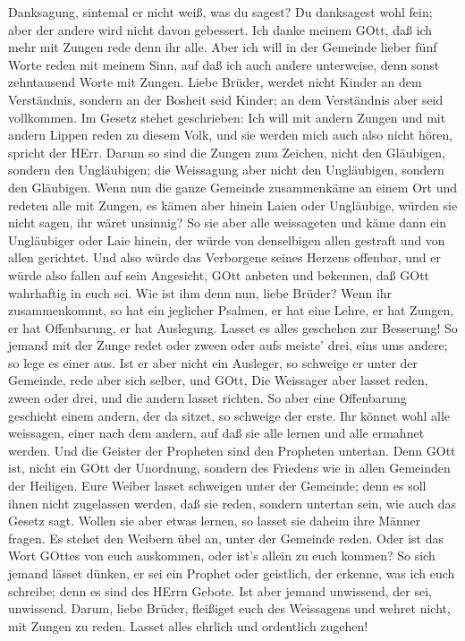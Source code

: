 Danksagung, sintemal er nicht weiß, was du sagest?  Du
danksagest wohl fein; aber der andere wird nicht davon gebessert.
 Ich danke meinem GOtt, daß ich mehr mit Zungen rede denn
ihr alle.  Aber ich will in der Gemeinde lieber fünf Worte
reden mit meinem Sinn, auf daß ich auch andere unterweise, denn sonst
zehntausend Worte mit Zungen.  Liebe Brüder, werdet nicht
Kinder an dem Verständnis, sondern an der Bosheit seid Kinder; an dem
Verständnis aber seid vollkommen.  Im Gesetz stehet
geschrieben: Ich will mit andern Zungen und mit andern Lippen reden zu
diesem Volk, und sie werden mich auch also nicht hören, spricht der
HErr.  Darum so sind die Zungen zum Zeichen, nicht den
Gläubigen, sondern den Ungläubigen; die Weissagung aber nicht den
Ungläubigen, sondern den Gläubigen.  Wenn nun die ganze
Gemeinde zusammenkäme an einem Ort und redeten alle mit Zungen, es kämen
aber hinein Laien oder Ungläubige, würden sie nicht sagen, ihr wäret
unsinnig?  So sie aber alle weissageten und käme dann ein
Ungläubiger oder Laie hinein, der würde von denselbigen allen gestraft
und von allen gerichtet.  Und also würde das Verborgene
seines Herzens offenbar, und er würde also fallen auf sein Angesicht,
GOtt anbeten und bekennen, daß GOtt wahrhaftig in euch sei.
 Wie ist ihm denn nun, liebe Brüder? Wenn ihr
zusammenkommt, so hat ein jeglicher Psalmen, er hat eine Lehre, er hat
Zungen, er hat Offenbarung, er hat Auslegung. Lasset es alles geschehen
zur Besserung!  So jemand mit der Zunge redet oder zween
oder aufs meiste' drei, eins ums andere; so lege es einer aus.
 Ist er aber nicht ein Ausleger, so schweige er unter der
Gemeinde, rede aber sich selber, und GOtt,  Die Weissager
aber lasset reden, zween oder drei, und die andern lasset richten.
 So aber eine Offenbarung geschieht einem andern, der da
sitzet, so schweige der erste.  Ihr könnet wohl alle
weissagen, einer nach dem andern, auf daß sie alle lernen und alle
ermahnet werden.  Und die Geister der Propheten sind den
Propheten untertan.  Denn GOtt ist, nicht ein GOtt der
Unordnung, sondern des Friedens wie in allen Gemeinden der Heiligen.
 Eure Weiber lasset schweigen unter der Gemeinde; denn es
soll ihnen nicht zugelassen werden, daß sie reden, sondern untertan
sein, wie auch das Gesetz sagt.  Wollen sie aber etwas
lernen, so lasset sie daheim ihre Männer fragen. Es stehet den Weibern
übel an, unter der Gemeinde reden.  Oder ist das Wort
GOttes von euch auskommen, oder ist's allein zu euch kommen?
 So sich jemand lässet dünken, er sei ein Prophet oder
geistlich, der erkenne, was ich euch schreibe; denn es sind des HErrn
Gebote.  Ist aber jemand unwissend, der sei, unwissend.
 Darum, liebe Brüder, fleißiget euch des Weissagens und
wehret nicht, mit Zungen zu reden.  Lasset alles ehrlich
und ordentlich zugehen!

